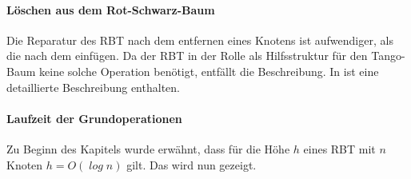 \documentclass[a4paper,12pt]{article}
\begin{document}
\paragraph{Löschen aus dem Rot-Schwarz-Baum}
Die Reparatur des RBT nach dem entfernen eines Knotens ist aufwendiger, als die nach dem einfügen. Da der RBT in der Rolle als Hilfsstruktur für den Tango-Baum keine solche Operation benötigt, entfällt die Beschreibung. In \cite{algEinf} ist eine detaillierte Beschreibung enthalten. 
\paragraph{Laufzeit der Grundoperationen}
Zu Beginn des Kapitels wurde erwähnt, dass für die Höhe $h$ eines RBT mit $n$ Knoten $h = \mathit{O(\log {n})}$  gilt. Das wird nun gezeigt. 
\end{document}
